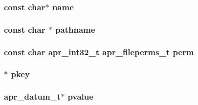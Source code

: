 \subsubsection[{\texorpdfstring{name}{name}}]{\setlength{\rightskip}{0pt plus 5cm}const char$\ast$ name}\hypertarget{group__APR__Util__DBM_ga8f8f80d37794cde9472343e4487ba3eb}{}\label{group__APR__Util__DBM_ga8f8f80d37794cde9472343e4487ba3eb}
\subsubsection[{\texorpdfstring{pathname}{pathname}}]{\setlength{\rightskip}{0pt plus 5cm}const char $\ast$ pathname}\hypertarget{group__APR__Util__DBM_gaf694cab4f4f6cd4b594af3c43cef1d0a}{}\label{group__APR__Util__DBM_gaf694cab4f4f6cd4b594af3c43cef1d0a}
\subsubsection[{\texorpdfstring{perm}{perm}}]{\setlength{\rightskip}{0pt plus 5cm}const char {\bf apr\+\_\+int32\+\_\+t} {\bf apr\+\_\+fileperms\+\_\+t} perm}\hypertarget{group__APR__Util__DBM_gaa8065a83f4f6501dc243d0c894030278}{}\label{group__APR__Util__DBM_gaa8065a83f4f6501dc243d0c894030278}
\subsubsection[{\texorpdfstring{pkey}{pkey}}]{ $\ast$ pkey}\hypertarget{group__APR__Util__DBM_ga1bbfe97dd2f6cc19a02af7fd6ef61fbd}{}\label{group__APR__Util__DBM_ga1bbfe97dd2f6cc19a02af7fd6ef61fbd}
\subsubsection[{\texorpdfstring{pvalue}{pvalue}}]{ {\bf apr\+\_\+datum\+\_\+t}$\ast$ pvalue}\hypertarget{group__APR__Util__DBM_ga28a8123792275d5480b92912a9e85b0e}{}\label{group__APR__Util__DBM_ga28a8123792275d5480b92912a9e85b0e}

